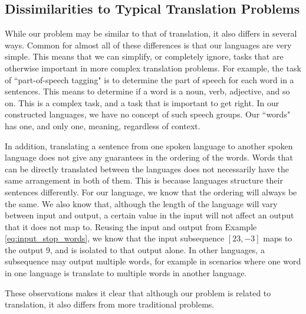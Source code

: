 \subsection{Dissimilarities to Typical Translation Problems}
While our problem may be similar to that of translation, it also differs in several ways. Common for almost all of these differences is that our languages are very simple. This means that we can simplify, or completely ignore, tasks that are otherwise important in more complex translation problems. For example, the task of ``part-of-speech tagging" is to determine the part of speech for each word in a sentences. This means to determine if a word is a noun, verb, adjective, and so on. This is a complex task, and a task that is important to get right. In our constructed languages, we have no concept of such speech groups. Our ``words" has one, and only one, meaning, regardless of context. 

In addition, translating a sentence from one spoken language to another spoken language does not give any guarantees in the ordering of the words. Words that can be directly translated between the languages does not necessarily have the same arrangement in both of them. This is because languages structure their sentences differently. For our language, we know that the ordering will always be the same. We also know that, although the length of the language will vary between input and output, a certain value in the input will not affect an output that it does not map to. Reusing the input and output from Example \ref{eq:input_stop_words}, we know that the input subsequence \([23, -3]\) maps to the output 9, and is isolated to that output alone. In other languages, a subsequence may output multiple words, for example in scenarios where one word in one language is translate to multiple words in another language.

These observations makes it clear that although our problem is related to translation, it also differs from more traditional problems. 